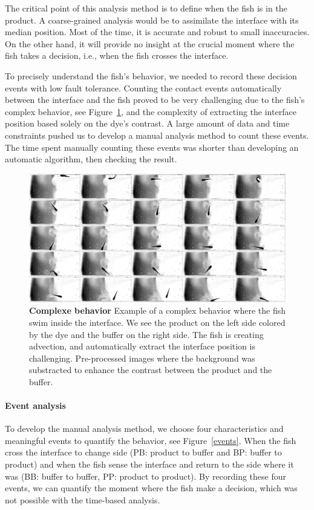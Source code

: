   The critical point of this analysis method is to define when the fish is in the product. A coarse-grained analysis would be to assimilate the interface with its median position. Most of the time, it is accurate and robust to small inaccuracies. On the other hand, it will provide no insight at the crucial moment where the fish takes a decision, i.e., when the fish crosses the interface.

  To precisely understand the fish's behavior, we needed to record these decision events with low fault tolerance. Counting the contact events automatically between the interface and the fish proved to be very challenging due to the fish's complex behavior, see Figure~\ref{behavior_comp}, and the complexity of extracting the interface position based solely on the dye's contrast. A large amount of data and time constraints pushed us to develop a manual analysis method to count these events. The time spent manually counting these events was shorter than developing an automatic algorithm, then checking the result.

    \begin{figure}[htp]
      \centering
      \includegraphics[width=1\textwidth]{part_2/assets/behavior.jpg}
      \caption{\textbf{Complexe behavior} Example of a complex behavior where the fish swim inside the interface. We see the product on the left side colored by the dye and the buffer on the right side. The fish is creating advection, and automatically extract the interface position is challenging. Pre-processed images where the background was substracted to enhance the contrast between the product and the buffer.}
      \label{behavior_comp}
    \end{figure}

  \paragraph{Event analysis} To develop the manual analysis method, we choose four characteristics and meaningful events to quantify the behavior, see Figure~\ref{events}. When the fish cross the interface to change side (PB: product to buffer and BP: buffer to product) and when the fish sense the interface and return to the side where it was (BB: buffer to buffer, PP: product to product). By recording these four events, we can quantify the moment where the fish make a decision, which was not possible with the time-based analysis.

